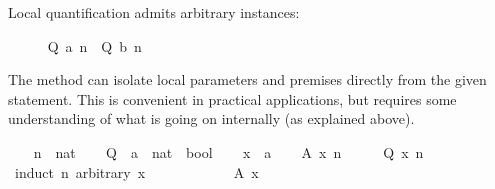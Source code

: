 \begin{isabellebody}
%
\begin{isamarkuptxt}%
Local quantification admits arbitrary instances:%
\end{isamarkuptxt}%
\isamarkuptrue%
\ \ \ \ \isamarkupfalse%
\ {}Q\ a\ n{}\ \ {}Q\ b\ n{}\isanewline
\ \ \isamarkupfalse%
%
\endisatagproof
{\isafoldproof}%
%
\isadelimproof
\isanewline
%
\endisadelimproof
{}\isamarkupfalse%
%
\isamarkuptrue%
%
\begin{isamarkuptext}%
The \hyperlink{method.induct}{\mbox{}} method can isolate local parameters and
  premises directly from the given statement.  This is convenient in
  practical applications, but requires some understanding of what is
  going on internally (as explained above).%
\end{isamarkuptext}%
\isamarkuptrue%
\isamarkupfalse%
\isanewline
{}\isanewline
%
\isadelimproof
\ \ %
\endisadelimproof
%
\isatagproof
{}\isamarkupfalse%
\ n\ {}{}\ nat\isanewline
\ \ \isamarkupfalse%
\ Q\ {}{}\ {}{}a\ {}\ nat\ {}\ bool{}\isanewline
\isanewline
\ \ \isamarkupfalse%
\ x\ {}{}\ {}a\isanewline
\ \ \isamarkupfalse%
\ {}A\ x\ n{}\isanewline
\ \ \isamarkupfalse%
\ \isamarkupfalse%
\ {}Q\ x\ n{}\isanewline
\ \ \isamarkupfalse%
\ {}induct\ n\ arbitrary{}\ x{}\isanewline
\ \ \ \ \isamarkupfalse%
\ {}\isanewline
\ \ \ \ \isamarkupfalse%
\ {}A\ x\ {}{}\ \isamarkupfalse%

\end{isabellebody}
